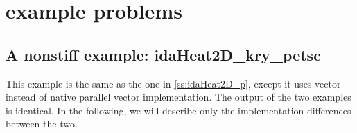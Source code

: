 \section{{\petsc} example problems}\label{s:ex_petsc}

\subsection{A nonstiff example: idaHeat2D\_kry\_petsc}\label{ss:idaHeat2D_kry_petsc}

This example is the same as the one in \ref{ss:idaHeat2D_p}, except 
it uses {\petsc} vector instead of {\sundials} native parallel vector 
implementation. The output of the two examples is identical. In the following, 
we will describe only the implementation differences between the two. 

